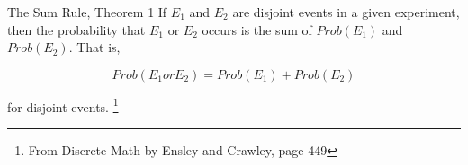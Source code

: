 \documentclass[a4paper,12pt]{book}
\newcounter{question}
\begin{document}
        \newpage
        \begin{intro}{The Sum Rule, Theorem 1}
            If $E_1$ and $E_2$ are disjoint events in a given experiment,
            then the probability that $E_1$ or $E_2$ occurs is the sum of
            $Prob(E_1)$ and $Prob(E_2)$. That is,

            $$Prob(E_1 or E_2) = Prob(E_1) + Prob(E_2)$$

            for disjoint events.
            \footnote{From Discrete Math by Ensley and Crawley, page 449}
        \end{intro}


\end{document}
